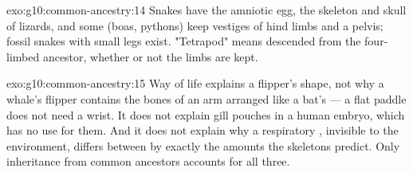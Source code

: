 \begin{solution}{exo:g10:common-ancestry:14}
Snakes have the amniotic egg, the skeleton and skull of lizards, and
some (boas, pythons) keep vestiges of hind limbs and a pelvis; fossil
snakes with small legs exist. "Tetrapod" means descended from the
four-limbed ancestor, whether or not the limbs are kept.
\end{solution}

\begin{solution}{exo:g10:common-ancestry:15}
Way of life explains a flipper's shape, not why a whale's flipper
contains the bones of an arm arranged like a bat's --- a flat paddle
does not need a wrist. It does not explain gill pouches in a human
embryo, which has no use for them. And it does not explain why a
respiratory , invisible to the environment, differs between
 by exactly the amounts the skeletons predict. Only inheritance
from common ancestors accounts for all three.
\end{solution}

